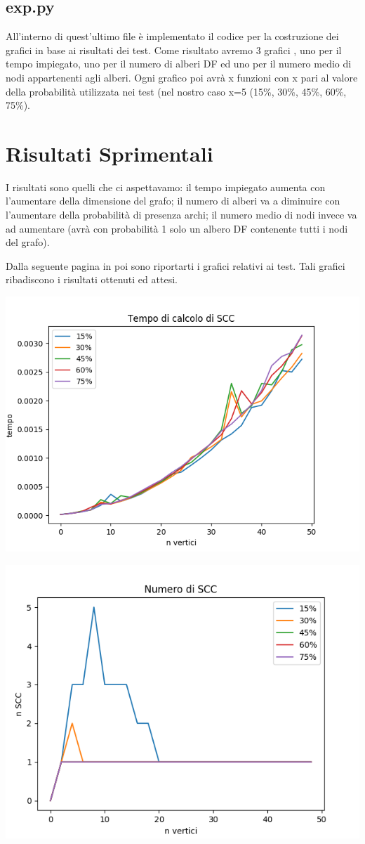\documentclass{article}
\begin{document}
\subsection{exp.py}
All'interno di quest'ultimo file è implementato il codice per la costruzione dei grafici in base ai risultati dei test. Come risultato avremo 3 grafici , uno per il tempo impiegato, uno per il numero di alberi DF ed uno per il numero medio di nodi appartenenti agli alberi. Ogni grafico poi avrà x funzioni con x pari al valore della probabilità utilizzata nei test (nel nostro caso x=5 (15\%, 30\%, 45\%, 60\%, 75\%).

\newpage
\section{Risultati Sprimentali}
I risultati sono quelli che ci aspettavamo: il tempo impiegato aumenta con l'aumentare della dimensione del grafo; il numero di alberi va a diminuire con l'aumentare della probabilità di presenza archi; il numero medio di nodi invece va ad aumentare (avrà con probabilità 1 solo un albero DF contenente tutti i nodi del grafo).

Dalla seguente pagina in poi sono riportarti i grafici relativi ai test. Tali grafici ribadiscono i risultati ottenuti ed attesi.

\includegraphics[scale=0.7]{tempo.png}

\includegraphics[scale=0.7]{alberi.png}
\end{document}
